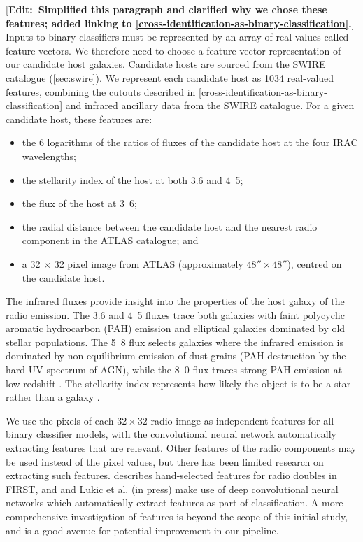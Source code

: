 \documentclass[fleqn,usenatbib,usedcolumn]{mnras}
\newcommand{\edit}[1]{ {\color{red}[{\bf Edit:~{#1}}]} }
\begin{document}
    \edit{Simplified this paragraph and clarified why we chose these features; added linking to \autoref{cross-identification-as-binary-classification}.} Inputs to binary classifiers must be represented by an array of real values called feature vectors. We therefore need to choose a feature vector representation of our candidate host galaxies. Candidate hosts are sourced from the SWIRE catalogue (\autoref{sec:swire}). We represent each candidate host as 1034 real-valued features, combining the cutouts described in \autoref{cross-identification-as-binary-classification} and infrared ancillary data from the SWIRE catalogue. For a given candidate host, these features are:
    \begin{itemize}
      \item the 6 logarithms of the ratios of fluxes of the candidate
        host at the four IRAC wavelengths;
      \item the stellarity index of the host at both 3.6 and
        \unit{4.5}{\micro\meter};
      \item the flux of the host at \unit{3.6}{\micro\meter};
      \item the radial distance between the candidate host and the nearest
        radio component in the ATLAS catalogue; and
      \item a 32 $\times$ 32 pixel image from ATLAS (approximately $48''
        \times 48''$), centred on the candidate host.
    \end{itemize}

    The infrared fluxes provide insight into the properties of the host galaxy of the radio emission. The 3.6 and \unit{4.5}{\micro\meter} fluxes trace both galaxies with faint polycyclic aromatic hydrocarbon (PAH) emission and elliptical galaxies dominated by old stellar populations. The \unit{5.8}{\micro\meter} flux selects galaxies where the infrared emission is dominated by non-equilibrium emission of dust grains (PAH destruction
    by the hard UV spectrum of AGN), while the \unit{8.0}{\micro\meter} flux traces strong PAH emission at low redshift \citep{Sajina2005}. The stellarity index represents how likely the object is to be a star rather than a galaxy \citep{surace05swire}.

    We use the pixels of each $32 \times 32$ radio image as independent features for all binary classifier models, with the convolutional neural network automatically extracting features that are relevant. Other features of the radio components may be used instead of the pixel values, but there has been limited research on extracting such features. \citet{proctor06} describes hand-selected features for radio doubles in FIRST, and \citet{aniyan17cnn} and Lukic et al. (in press) make use of deep convolutional neural networks which automatically extract features as part of classification. A more comprehensive investigation of features is beyond the scope of this initial study, and is a good avenue for potential improvement in our pipeline.
\end{document}
